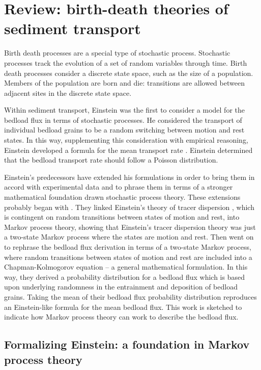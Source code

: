 \section{Review: birth-death theories of sediment transport}

Birth death processes are a special type of stochastic process. 
Stochastic processes track the evolution of a set of random variables through time. 
Birth death processes consider a discrete state space, such as the size of a population. 
Members of the population are born and die: transitions are allowed between adjacent sites in the discrete state space. 

Within sediment transport, Einstein was the first to consider a model for the bedload flux in terms of stochastic processes. 
He considered the transport of individual bedload grains to be a random switching between motion and rest states. 
In this way, supplementing this consideration with empirical reasoning, Einstein developed a formula for the mean transport rate \citep{Einstein1950}. 
Einstein determined that the bedload transport rate should follow a Poisson distribution. 

Einstein's predecessors have extended his formulations in order to bring them in accord with experimental data and to phrase them in terms of a stronger mathematical foundation drawn stochastic process theory. 
These extensions probably began with \citet{Lisle1998}. 
They linked Einstein's theory of tracer dispersion \citep{Einstein1937}, which is contingent on random transitions between states of motion and rest, into Markov process theory, showing that Einstein's tracer dispersion theory was just a two-state Markov process where the states are motion and rest.  
Then \citet{Ancey2006} went on to rephrase the \citet{Einstein1950} bedload flux derivation in terms of a two-state Markov process, where random transitions between states of motion and rest are included into a Chapman-Kolmogorov equation -- a general mathematical formulation. 
In this way, they derived a probability distribution for a bedload flux which is based upon underlying randomness in the entrainment and deposition of bedload grains. 
Taking the mean of their bedload flux probability distribution reproduces an Einstein-like formula for the mean bedload flux. 
This work is sketched to indicate how Markov process theory can work to describe the bedload flux. 

\subsection{Formalizing Einstein: a foundation in Markov process theory} 

